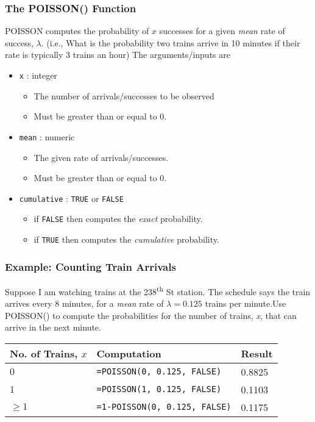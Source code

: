 \documentclass[12pt]{beamer}
\begin{document}
	\begin{frame}
		\frametitle{The POISSON() Function}
		POISSON computes the probability of $x$ successes for a given \textit{mean} rate of success, $\lambda$. (i.e., What is the probability two trains arrive in 10 minutes if their rate is typically 3 trains an hour)  The arguments/inputs are
		\begin{itemize}
			\item \texttt{x} : integer
			\begin{itemize}
				\item The number of arrivals/successes to be observed
				\item Must be greater than or equal to 0.
			\end{itemize}
			\item \texttt{mean} : numeric
			\begin{itemize}
				\item The given rate of arrivals/successes. 
				\item Must be greater than or equal to 0. 
			\end{itemize}
			\item \texttt{cumulative} : \texttt{TRUE} or \texttt{FALSE}
			\begin{itemize}
				\item if \texttt{FALSE} then computes the \textit{exact} probability.
				\item if \texttt{TRUE} then computes the \textit{cumulative} probability.
			\end{itemize}
		\end{itemize}
	\end{frame}
	\begin{frame}
		\frametitle{Example: Counting Train Arrivals}
		Suppose I am watching trains at the 238\textsuperscript{th} St station. The schedule says the train arrives every 8 minutes, for a \textit{mean} rate of $\lambda=0.125$ trains per minute.Use POISSON() to compute the probabilities for the number of trains, \textit{x},  that can arrive in the next minute. 
		\begin{center}
			\begin{tabular}{l | l | l}
				No. of Trains, $x$ & Computation & Result \\ 
				\hline
				$0$ &  \texttt{=POISSON(0, 0.125, FALSE)} & 0.8825\\
				$1$ & \texttt{=POISSON(1, 0.125, FALSE)}& 0.1103\\
				$\geq 1$ & \texttt{=1-POISSON(0, 0.125, FALSE)} & 0.1175  
			\end{tabular}
		\end{center}
	\end{frame}
\end{document}
